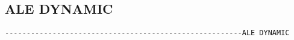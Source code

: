 












\subsection{ALE DYNAMIC}
\begin{verbatim}
-------------------------------------------------------ALE DYNAMIC
\end{verbatim}


